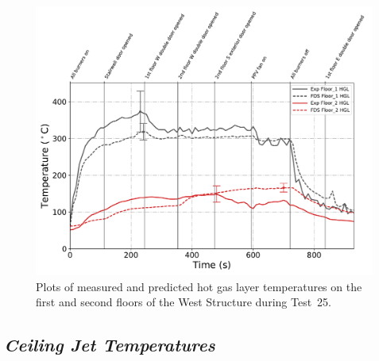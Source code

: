 \begin{figure}[!h]
	\centering
	\includegraphics[width=\columnwidth]{Figures/Plots/Validation/Temperature/Test_25_HGL}
	\caption[Plots of measured and predicted hot gas layer temperatures during Test~25.]{Plots of measured and predicted hot gas layer temperatures on the first and second floors of the West Structure during Test~25.}
	\label{fig:HGL_data_Test25}
\end{figure}

\clearpage
\subsection*{\textit{Ceiling Jet Temperatures}}

